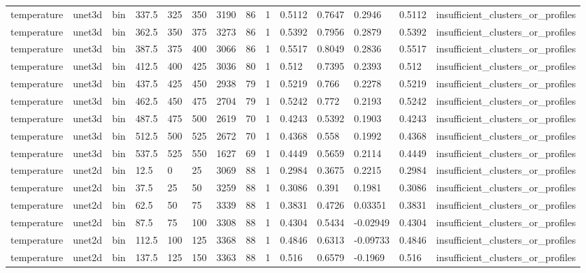 \begin{table}[htbp]
\begin{tabular}{llllllllllllll}
temperature & unet3d & bin & 337.5 & 325 & 350 & 3190 & 86 & 1 & 0.5112 & 0.7647 & 0.2946 & 0.5112 & insufficient\_clusters\_or\_profiles \\
temperature & unet3d & bin & 362.5 & 350 & 375 & 3273 & 86 & 1 & 0.5392 & 0.7956 & 0.2879 & 0.5392 & insufficient\_clusters\_or\_profiles \\
temperature & unet3d & bin & 387.5 & 375 & 400 & 3066 & 86 & 1 & 0.5517 & 0.8049 & 0.2836 & 0.5517 & insufficient\_clusters\_or\_profiles \\
temperature & unet3d & bin & 412.5 & 400 & 425 & 3036 & 80 & 1 & 0.512 & 0.7395 & 0.2393 & 0.512 & insufficient\_clusters\_or\_profiles \\
temperature & unet3d & bin & 437.5 & 425 & 450 & 2938 & 79 & 1 & 0.5219 & 0.766 & 0.2278 & 0.5219 & insufficient\_clusters\_or\_profiles \\
temperature & unet3d & bin & 462.5 & 450 & 475 & 2704 & 79 & 1 & 0.5242 & 0.772 & 0.2193 & 0.5242 & insufficient\_clusters\_or\_profiles \\
temperature & unet3d & bin & 487.5 & 475 & 500 & 2619 & 70 & 1 & 0.4243 & 0.5392 & 0.1903 & 0.4243 & insufficient\_clusters\_or\_profiles \\
temperature & unet3d & bin & 512.5 & 500 & 525 & 2672 & 70 & 1 & 0.4368 & 0.558 & 0.1992 & 0.4368 & insufficient\_clusters\_or\_profiles \\
temperature & unet3d & bin & 537.5 & 525 & 550 & 1627 & 69 & 1 & 0.4449 & 0.5659 & 0.2114 & 0.4449 & insufficient\_clusters\_or\_profiles \\
temperature & unet2d & bin & 12.5 & 0 & 25 & 3069 & 88 & 1 & 0.2984 & 0.3675 & 0.2215 & 0.2984 & insufficient\_clusters\_or\_profiles \\
temperature & unet2d & bin & 37.5 & 25 & 50 & 3259 & 88 & 1 & 0.3086 & 0.391 & 0.1981 & 0.3086 & insufficient\_clusters\_or\_profiles \\
temperature & unet2d & bin & 62.5 & 50 & 75 & 3339 & 88 & 1 & 0.3831 & 0.4726 & 0.03351 & 0.3831 & insufficient\_clusters\_or\_profiles \\
temperature & unet2d & bin & 87.5 & 75 & 100 & 3308 & 88 & 1 & 0.4304 & 0.5434 & -0.02949 & 0.4304 & insufficient\_clusters\_or\_profiles \\
temperature & unet2d & bin & 112.5 & 100 & 125 & 3368 & 88 & 1 & 0.4846 & 0.6313 & -0.09733 & 0.4846 & insufficient\_clusters\_or\_profiles \\
temperature & unet2d & bin & 137.5 & 125 & 150 & 3363 & 88 & 1 & 0.516 & 0.6579 & -0.1969 & 0.516 & insufficient\_clusters\_or\_profiles \\

\end{tabular}
\end{table}

